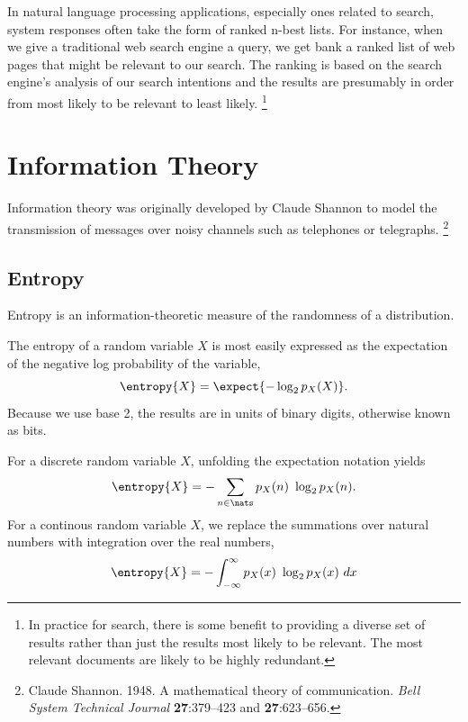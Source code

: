 In natural language processing applications, especially ones related
to search, system responses often take the form of ranked n-best
lists.  For instance, when we give a traditional web search engine a
query, we get bank a ranked list of web pages that might be relevant
to our search.  The ranking is based on the search engine's analysis
of our search intentions and the results are presumably in order
from most likely to be relevant to least likely.%
%
\footnote{In practice for search, there is some benefit to providing a
  diverse set of results rather than just the results most likely to
  be relevant.  The most relevant documents are likely to be highly
  redundant.}



\section{Information Theory}\label{section:stats-information-theory}

Information theory was originally developed by Claude Shannon to model
the transmission of messages over noisy channels such as telephones
or telegraphs.%
%
\footnote{Claude Shannon. 1948.  A mathematical theory of
  communication.  {\it Bell System Technical Journal} {\bf
    27}:379--423 and {\bf 27}:623--656.}

\subsection{Entropy}\label{section:stats-entropy}

Entropy is an information-theoretic measure of the randomness of a
distribution.  


The entropy of a random variable $X$ is most easily expressed as the
expectation of the negative log probability of the variable,
%
\begin{equation}
\entropy{X} = \expect{- \log_2 p_X(X)}.
\end{equation}
%
Because we use base 2, the results are in units of binary digits,
otherwise known as bits.

For a discrete random variable $X$, unfolding the expectation notation
yields
%
\begin{equation}
\entropy{X} = - \sum_{n \in \nats} p_X(n) \ \log_2 p_X(n).
\end{equation}
%
For a continous random variable $X$, we replace the summations
over natural numbers with integration over the real numbers,
%
\begin{equation}
\entropy{X} = - \int_{-\infty}^{\infty} p_X(x) \ \log_2 p_X(x) \ dx
\end{equation}

